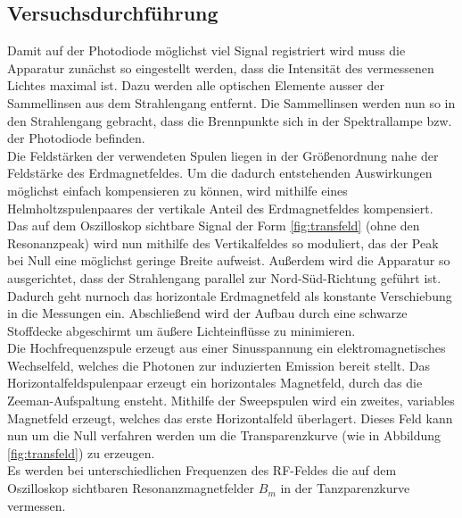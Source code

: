 \subsection{Versuchsdurchführung}
Damit auf der Photodiode möglichst viel Signal registriert wird muss die Apparatur zunächst so eingestellt werden, dass die Intensität des vermessenen Lichtes maximal ist. Dazu werden alle optischen Elemente ausser der Sammellinsen aus dem Strahlengang entfernt.
Die Sammellinsen werden nun so in den Strahlengang gebracht, dass die Brennpunkte sich in der Spektrallampe bzw. der Photodiode befinden.\\
Die Feldstärken der verwendeten Spulen liegen in der Größenordnung nahe der Feldstärke des Erdmagnetfeldes.
Um die dadurch entstehenden Auswirkungen möglichst einfach kompensieren zu können, wird mithilfe eines Helmholtzspulenpaares der vertikale Anteil des Erdmagnetfeldes kompensiert. Das auf dem Oszilloskop sichtbare Signal der Form \ref{fig:transfeld} (ohne den Resonanzpeak) wird nun mithilfe des Vertikalfeldes so moduliert, das der Peak bei Null eine möglichst geringe Breite aufweist. Außerdem wird die Apparatur so ausgerichtet, dass der Strahlengang parallel zur Nord-Süd-Richtung geführt ist. Dadurch geht nurnoch das horizontale Erdmagnetfeld als konstante Verschiebung in die Messungen ein. Abschließend wird der Aufbau durch eine schwarze Stoffdecke abgeschirmt um äußere Lichteinflüsse zu minimieren.\\
Die Hochfrequenzspule erzeugt aus einer Sinusspannung ein elektromagnetisches Wechselfeld, welches die Photonen zur induzierten Emission bereit stellt. Das Horizontalfeldspulenpaar erzeugt ein horizontales Magnetfeld, durch das die Zeeman-Aufspaltung ensteht. Mithilfe der Sweepspulen wird ein zweites, variables Magnetfeld erzeugt, welches das erste Horizontalfeld überlagert. Dieses Feld kann nun um die Null verfahren werden um die Transparenzkurve (wie in Abbildung \ref{fig:transfeld}) zu erzeugen.\\
Es werden bei unterschiedlichen Frequenzen des RF-Feldes die auf dem Oszilloskop sichtbaren Resonanzmagnetfelder $B_m$ in der Tanzparenzkurve vermessen.
